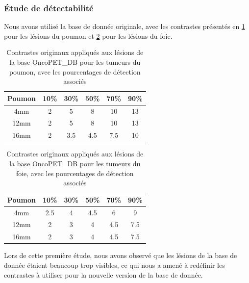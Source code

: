 \subsubsection{Étude de détectabilité}

Nous avons utilisé la base de donnée originale, avec les contrastes présentés en \ref{tab:contrastePoumonOrig} pour les lésions du poumon et \ref{tab:contrasteFoieOrig} pour les lésions du foie.

\begin{table}
\centering
\begin{tabular}{|c||c|c|c|c|c|}
 \hline
Poumon	& 10\% & 30\% & 50\% & 70\% & 90\% \\
\hline
4mm	& 2    &  5   &  8   & 10   & 13   \\
\hline
12mm    & 2    &  5   &  8   & 10   & 13   \\
\hline
16mm    & 2    &  3.5 &  4.5 & 7.5  & 10   \\
\hline
\end{tabular}

\caption[Contraste originaux des lésions du poumon pour létude de détectabilité]{Contrastes originaux appliqués aux lésions de la base OncoPET\_DB pour les tumeurs du poumon, avec les pourcentages de détection associés}
\label{tab:contrastePoumonOrig}
\end{table}

\begin{table}
\centering

\begin{tabular}{|c||c|c|c|c|c|}
 \hline
Poumon	& 10\% & 30\% & 50\% & 70\% & 90\% \\
\hline
4mm	& 2.5    &  4   &  4.5   & 6   & 9   \\
\hline
12mm    & 2    &  3   &  4   & 4.5   & 7.5   \\
\hline
16mm    & 2    &  3   &  4   & 4.5   & 7.5   \\
\hline
\end{tabular}

\caption[Contraste originaux des lésions du foie pour létude de détectabilité]{Contrastes originaux appliqués aux lésions de la base OncoPET\_DB pour les tumeurs du foie, avec les pourcentages de détection associés}
\label{tab:contrasteFoieOrig}
\end{table}

Lors de cette première étude, nous avons observé que les lésions de la base de donnée étaient beaucoup trop visibles, ce qui nous a amené à redéfinir les contrastes à utiliser pour la nouvelle version de la base de donnée. 

